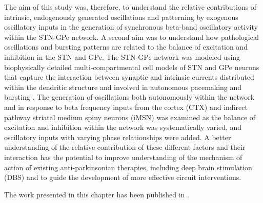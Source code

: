 %
The aim of this study was, therefore, to understand the relative contributions of intrinsic, endogenously generated oscillations and patterning by exogenous oscillatory inputs in the generation of synchronous beta-band oscillatory activity within the STN-GPe network. A second aim was to understand how pathological oscillations and bursting patterns are related to the balance of excitation and inhibition in the STN and GPe. The STN-GPe network was modeled using biophysically detailed multi-compartmental cell models of STN and GPe neurons that capture the interaction between synaptic and intrinsic currents distributed within the dendritic structure and involved in autonomous pacemaking and bursting \cite{gillies_membrane_2005,gunay_channel_2008}.
%
The generation of oscillations both autonomously within the network and in response to beta frequency inputs from the cortex (CTX) and indirect pathway striatal medium spiny neurons (iMSN) was examined as the balance of excitation and inhibition within the network was systematically varied, and oscillatory inputs with varying phase relationships were added. A better understanding of the relative contribution of these different factors and their interaction has the potential to improve understanding of the mechanism of action of existing anti-parkinsonian therapies, including deep brain stimulation (DBS) and to guide the development of more effective circuit interventions.

%
%
%
%

The work presented in this chapter has been published in \cite{koelman_beta-band_2019}.

